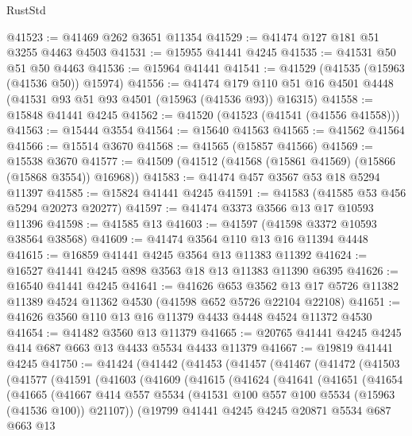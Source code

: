 \begin{lexlean}{RustStd}
\begin{coremodule}
@41523 := @41469 @262 @3651 @11354
@41529 := @41474 @127 @181 @51 @3255 @4463 @4503
@41531 := @15955 @41441 @4245
@41535 := @41531 @50 @51 @50 @4463
@41536 := @15964 @41441
@41541 := @41529 (@41535 (@15963 (@41536 @50)) @15974)
@41556 := @41474
    @179
    @110
    @51
    @16
    @4501
    @4448
    (@41531 @93 @51 @93 @4501 (@15963 (@41536 @93)) @16315)
@41558 := @15848 @41441 @4245
@41562 := @41520 (@41523 (@41541 (@41556 @41558)))
@41563 := @15444 @3554
@41564 := @15640 @41563
@41565 := @41562 @41564
@41566 := @15514 @3670
@41568 := @41565 (@15857 @41566)
@41569 := @15538 @3670
@41577 := @41509 (@41512 (@41568 (@15861 @41569) (@15866 (@15868 @3554)) @16968))
@41583 := @41474 @457 @3567 @53 @18 @5294 @11397
@41585 := @15824 @41441 @4245
@41591 := @41583 (@41585 @53 @456 @5294 @20273 @20277)
@41597 := @41474 @3373 @3566 @13 @17 @10593 @11396
@41598 := @41585 @13
@41603 := @41597 (@41598 @3372 @10593 @38564 @38568)
@41609 := @41474 @3564 @110 @13 @16 @11394 @4448
@41615 := @16859 @41441 @4245 @3564 @13 @11383 @11392
@41624 := @16527 @41441 @4245 @898 @3563 @18 @13 @11383 @11390 @6395
@41626 := @16540 @41441 @4245
@41641 := @41626
    @653
    @3562
    @13
    @17
    @5726
    @11382
    @11389
    @4524
    @11362
    @4530
    (@41598 @652 @5726 @22104 @22108)
@41651 := @41626 @3560 @110 @13 @16 @11379 @4433 @4448 @4524 @11372 @4530
@41654 := @41482 @3560 @13 @11379
@41665 := @20765 @41441 @4245 @4245 @414 @687 @663 @13 @4433 @5534 @4433 @11379
@41667 := @19819 @41441 @4245
@41750 := @41424
    (@41442
      (@41453
        (@41457
          (@41467
            (@41472
              (@41503
                (@41577
                  (@41591
                    (@41603
                      (@41609
                        (@41615
                          (@41624
                            (@41641
                              (@41651
                                (@41654
                                  (@41665
                                    (@41667
                                      @414
                                      @557
                                      @5534
                                      (@41531 @100 @557 @100 @5534 (@15963 (@41536 @100)) @21107))
                                    (@19799
                                      @41441
                                      @4245
                                      @4245
                                      @20871
                                      @5534
                                      @687
                                      @663
                                      @13

\end{coremodule}
\end{lexlean}
